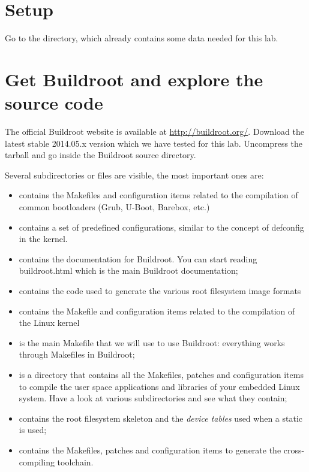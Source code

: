 
\section{Setup}

Go to the  directory,
which already contains some data needed for this lab.

\section{Get Buildroot and explore the source code}

The official Buildroot website is available at
\url{http://buildroot.org/}. Download the latest stable 2014.05.x
version which we have tested for this lab. Uncompress the tarball
and go inside the Buildroot source directory.

Several subdirectories or files are visible, the most important ones
are:

\begin{itemize}
\item {} contains the Makefiles and configuration items
  related to the compilation of common bootloaders (Grub, U-Boot,
  Barebox, etc.)
\item {} contains a set of predefined configurations,
  similar to the concept of defconfig in the kernel.
\item {} contains the documentation for Buildroot. You can
  start reading buildroot.html which is the main Buildroot
  documentation;
\item {} contains the code used to generate the various root
  filesystem image formats
\item {} contains the Makefile and configuration items
  related to the compilation of the Linux kernel
\item {} is the main Makefile that we will use to use
  Buildroot: everything works through Makefiles in Buildroot;
\item {} is a directory that contains all the Makefiles,
  patches and configuration items to compile the user space
  applications and libraries of your embedded Linux system. Have a
  look at various subdirectories and see what they contain;
\item {} contains the root filesystem skeleton and the {\em
    device tables} used when a static  is used;
\item {} contains the Makefiles, patches and
  configuration items to generate the cross-compiling toolchain.
\end{itemize}

